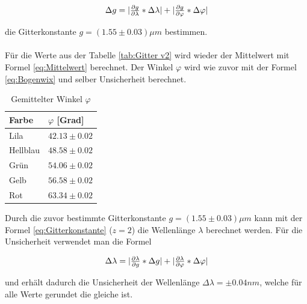 \documentclass[12pt,a4paper,twoside]{article}
\begin{document}
\begin{equation}
    \label{eq:uns gitterkonstante}
    \centerline{$ \Delta g = \vert \frac{\partial g}{\partial \lambda} * \Delta \lambda \vert + \vert \frac{\partial g}{\partial \varphi} * \Delta \varphi \vert$}
\end{equation}

\noindent
die Gitterkonstante $g = (1.55 \pm 0.03) \mu m$ bestimmen. 
\\
\\
Für die Werte aus der Tabelle \ref{tab:Gitter v2} wird wieder der Mittelwert mit Formel \ref{eq:Mittelwert} berechnet. 
Der Winkel $\varphi$ wird wie zuvor mit der Formel \ref{eq:Bogenwix} und selber Unsicherheit berechnet. 

\begin{table}[H]
    \centering
    \caption{Gemittelter Winkel $\varphi$}
    \label{tab:gitterwinkel}
    \begin{tabular}{| l | l |}
        \hline
        Farbe & $\varphi$ [Grad] \\
        \hline
        Lila        & $ 42.13 \pm 0.02 $ \\
        Hellblau    & $ 48.58 \pm 0.02 $ \\
        Grün        & $ 54.06 \pm 0.02 $ \\
        Gelb        & $ 56.58 \pm 0.02 $ \\
        Rot         & $ 63.34 \pm 0.02 $ \\
        \hline
    \end{tabular}
\end{table}

\noindent
Durch die zuvor bestimmte Gitterkonstante $g = (1.55 \pm 0.03) \mu m$ kann mit der Formel \ref{eq:Gitterkonstante} ($z=2$) die Wellenlänge $\lambda$ berechnet werden. 
Für die Unsicherheit verwendet man die Formel

\begin{equation}
    \label{eq:uns wellenwix}
    \centerline{$ \Delta \lambda = \vert \frac{\partial \lambda}{\partial g} * \Delta g \vert + \vert \frac{\partial \lambda }{\partial \varphi} * \Delta \varphi \vert$}
\end{equation}

\noindent
und erhält dadurch die Unsicherheit der Wellenlänge $\Delta \lambda = \pm 0.04 nm$, welche für alle Werte gerundet die gleiche ist. 
\end{document}
